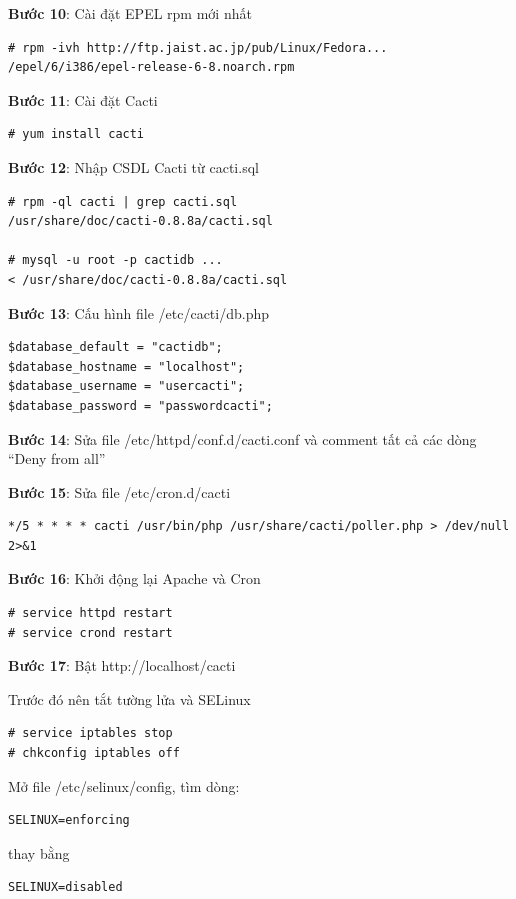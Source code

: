 \documentclass[12pt,oneside,a4paper,reqno]{report}
\begin{document}
\begin{large}
\textbf{Bước 10}: Cài đặt EPEL rpm mới nhất

\begin{lstlisting}
# rpm -ivh http://ftp.jaist.ac.jp/pub/Linux/Fedora...
/epel/6/i386/epel-release-6-8.noarch.rpm
\end{lstlisting}

\textbf{Bước 11}: Cài đặt Cacti

\begin{lstlisting}
# yum install cacti
\end{lstlisting}

\textbf{Bước 12}: Nhập CSDL Cacti từ cacti.sql

\begin{lstlisting}
# rpm -ql cacti | grep cacti.sql
/usr/share/doc/cacti-0.8.8a/cacti.sql

# mysql -u root -p cactidb ...
< /usr/share/doc/cacti-0.8.8a/cacti.sql
\end{lstlisting}

\textbf{Bước 13}: Cấu hình file /etc/cacti/db.php

\begin{lstlisting}
$database_default = "cactidb";
$database_hostname = "localhost";
$database_username = "usercacti";
$database_password = "passwordcacti";
\end{lstlisting}

\textbf{Bước 14}: Sửa file /etc/httpd/conf.d/cacti.conf và comment tất cả các dòng “Deny from all”

\textbf {Bước 15}: Sửa file /etc/cron.d/cacti
\begin{lstlisting}
*/5 * * * * cacti /usr/bin/php /usr/share/cacti/poller.php > /dev/null 2>&1
\end{lstlisting}

\textbf{Bước 16}: Khởi động lại Apache và Cron

\begin{lstlisting}
# service httpd restart
# service crond restart
\end{lstlisting}

\textbf{Bước 17}: Bật http://localhost/cacti

Trước đó nên tắt tường lửa và SELinux

\begin{lstlisting}
# service iptables stop
# chkconfig iptables off
\end{lstlisting}

Mở file /etc/selinux/config, tìm dòng:
\begin{lstlisting}
SELINUX=enforcing
\end{lstlisting}
thay bằng
\begin{lstlisting}
SELINUX=disabled
\end{lstlisting}


\end{large}
\end{document}
